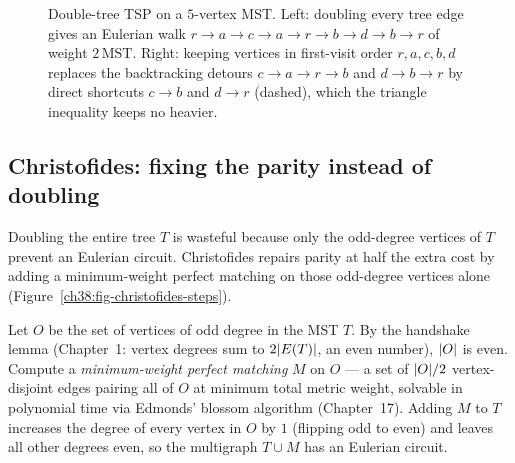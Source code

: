 \begin{figure}[htbp]
\caption{Double-tree TSP on a $5$-vertex MST. Left: doubling every tree edge gives an Eulerian walk $r\to a\to c\to a\to r\to b\to d\to b\to r$ of weight $2\,\mathrm{MST}$. Right: keeping vertices in first-visit order $r,a,c,b,d$ replaces the backtracking detours $c\to a\to r\to b$ and $d\to b\to r$ by direct shortcuts $c\to b$ and $d\to r$ (dashed), which the triangle inequality keeps no heavier.}
\label{ch38:fig-doubletree}
\end{figure}

\subsection{Christofides: fixing the parity instead of doubling}

Doubling the entire tree $T$ is wasteful because only the odd-degree vertices of $T$ prevent an Eulerian
circuit. Christofides repairs parity at half the extra cost by adding a minimum-weight perfect matching on
those odd-degree vertices alone (Figure~\ref{ch38:fig-christofides-steps}).

\begin{focusbox}
Let $O$ be the set of vertices of odd degree in the MST $T$. By the handshake lemma (Chapter~1: vertex
degrees sum to $2\lvert E(T)\rvert$, an even number), $\lvert O\rvert$ is even. Compute a \emph{minimum-weight perfect
matching} $M$ on $O$ --- a set of $\lvert O\rvert/2$ vertex-disjoint edges pairing all of $O$ at minimum total metric
weight, solvable in polynomial time via Edmonds' blossom algorithm (Chapter~17). Adding $M$ to $T$ increases
the degree of every vertex in $O$ by $1$ (flipping odd to even) and leaves all other degrees even, so the
multigraph $T\cup M$ has an Eulerian circuit.
\end{focusbox}

